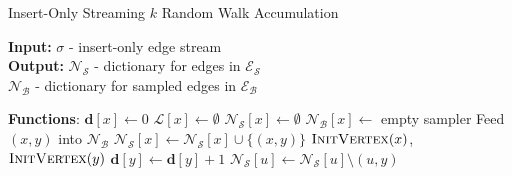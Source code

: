 \documentclass{report}
\newcommand{\algoname}[1]{\textnormal{\textsc{#1}}}
\begin{document}
\begin{algorithm}[htbp] 
\caption{Insert-Only Streaming $k$ Random Walk Accumulation}\label{alg:rw:serial:insert-only:accumulation}
\begin{flushleft}
        \textbf{Input:} 		$\sigma$ - insert-only edge stream\\
        \textbf{Output:} $\mathcal{N}_\mathcal{S}$ - dictionary for edges in $\mathcal{E}_\mathcal{S}$ \\
        	\hspace{4.05em}	$\mathcal{N}_\mathcal{B}$ - dictionary for sampled edges in $\mathcal{E}_\mathcal{B}$
\end{flushleft}
\begin{flushleft}
\begin{algorithmic}[1]
	\Statex \textbf{Functions}:
				\State $\mathbf{d}[x] \gets 0$
				\State $\mathcal{L}[x] \gets \emptyset$			
				\State $\mathcal{N}_\mathcal{S}[x] \gets \emptyset$			
				\State $\mathcal{N}_\mathcal{B}[x] \gets$ empty sampler			
			\EndIf
		\EndFunction
				\State Feed $(x,y)$ into $\mathcal{N}_\mathcal{B}$
			\Else
				\State $\mathcal{N}_\mathcal{S}[x] \gets \mathcal{N}_\mathcal{S}[x] \cup \{(x, y)\}$
			\EndIf
		\EndFunction
			\State $\algoname{InitVertex}(x)$, $\algoname{InitVertex}(y)$
			\State $\mathbf{d}[y] \gets \mathbf{d}[y] + 1$
					\State $\mathcal{N}_\mathcal{S}[u] \gets \mathcal{N}_\mathcal{S}[u] \setminus (u, y)$

\end{algorithmic}
\end{flushleft}
\end{algorithm}
\end{document}
